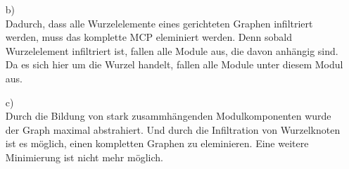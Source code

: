 \documentclass[a4paper,11pt,ngerman]{scrartcl}
\begin{document}
\begin{enumerate}
\begin{enumerate}
			\item[b)]\quad \\
				Dadurch, dass alle Wurzelelemente eines gerichteten Graphen infiltriert werden, muss das komplette MCP eleminiert werden. Denn sobald Wurzelelement infiltriert ist, fallen alle Module aus, die davon anhängig sind. Da es sich hier um die Wurzel handelt, fallen alle Module unter diesem Modul aus.
			\item[c)]\quad \\
				Durch die Bildung von stark zusammhängenden Modulkomponenten wurde der Graph maximal abstrahiert. Und durch die Infiltration von Wurzelknoten ist es möglich, einen kompletten Graphen zu eleminieren. Eine weitere Minimierung ist nicht mehr möglich.
		\end{enumerate}
	\end{enumerate}
\end{document}
